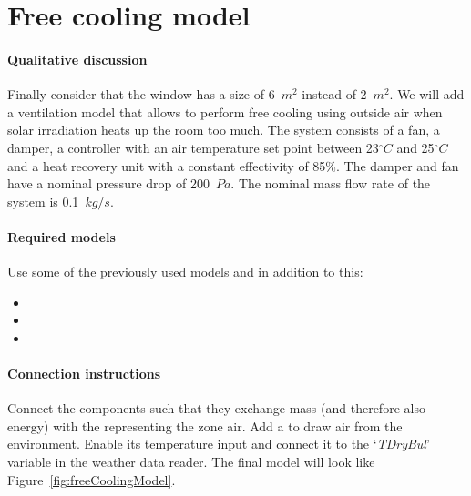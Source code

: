 \documentclass[10pt,a4paper]{article}
\begin{document}
\section{Free cooling model}
\paragraph{Qualitative discussion}
Finally consider that the window has a size of
6~$m^2$ instead of 2~$m^2$.
We will add a ventilation model that allows to
perform free cooling using outside air when
solar irradiation heats up the room too much.
The system consists of a fan,
a damper,
a controller with an air temperature 
set point between 23$^{\circ}C$ and 25$^{\circ}C$
and a heat recovery unit with a constant effectivity of 85\%.
The damper and fan have a nominal pressure drop of 200~$Pa$. 
The nominal mass flow rate of the system is 0.1~$kg/s$.


\paragraph{Required models}
Use some of the previously used models and in addition to this:
\begin{itemize}
\item {}
\item {}
\item {}
\end{itemize}

\paragraph{Connection instructions}
Connect the components such that they exchange mass 
(and therefore also energy) with the 
representing the zone air.
Add a  to draw air from the environment.
Enable its temperature input and connect it to the `\textit{TDryBul}'
variable in the weather data reader. The final model will look like
Figure~\ref{fig:freeCoolingModel}.
\end{document}
